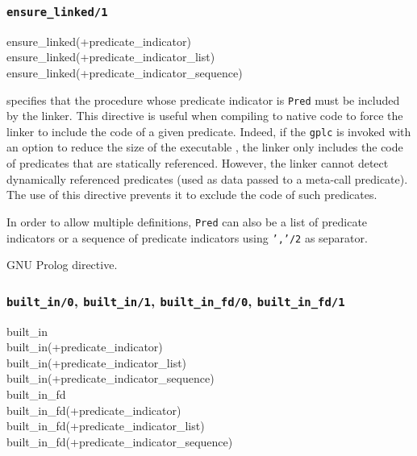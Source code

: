 \subsubsection{\texttt{ensure\_linked/1}}

\begin{TemplatesOneCol}
ensure\_linked(+predicate\_indicator)\\
ensure\_linked(+predicate\_indicator\_list)\\
ensure\_linked(+predicate\_indicator\_sequence)

\end{TemplatesOneCol}

\Description

 specifies that the procedure
whose predicate indicator is \texttt{Pred} must be included by the linker.
This directive is useful when compiling to native code to force the linker to
include the code of a given predicate. Indeed, if the \texttt{gplc} is
invoked with an option to reduce the size of the executable
, the linker only includes the code of predicates
that are statically referenced. However, the linker cannot detect dynamically
referenced predicates (used as data passed to a meta-call predicate). The use
of this directive prevents it to exclude the code of such predicates.

In order to allow multiple definitions, \texttt{Pred} can also be a list of
predicate indicators or a sequence of predicate indicators using
\texttt{','/2} as separator.

\Portability

GNU Prolog directive.

\subsubsection{\texttt{built\_in/0},
\texttt{built\_in/1},
\texttt{built\_in\_fd/0},
\texttt{built\_in\_fd/1}}

\begin{TemplatesOneCol}
built\_in\\
built\_in(+predicate\_indicator)\\
built\_in(+predicate\_indicator\_list)\\
built\_in(+predicate\_indicator\_sequence)\\
built\_in\_fd\\
built\_in\_fd(+predicate\_indicator)\\
built\_in\_fd(+predicate\_indicator\_list)\\
built\_in\_fd(+predicate\_indicator\_sequence)

\end{TemplatesOneCol}

